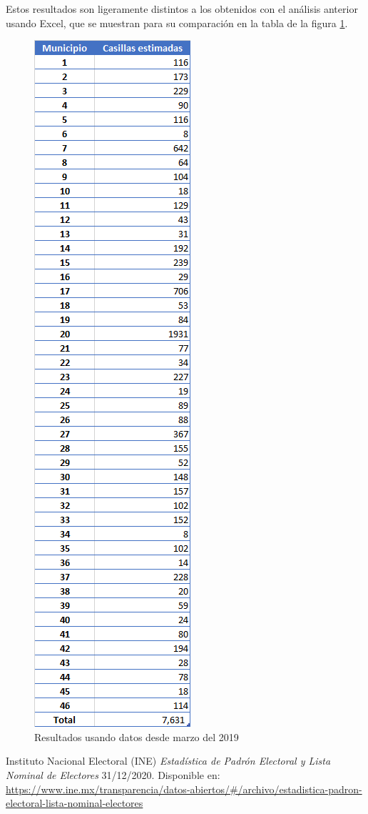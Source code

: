 \documentclass[twocolumn]{article}
\begin{document}
Estos resultados son ligeramente distintos a los obtenidos con el análisis anterior usando Excel, que se muestran para su comparación en la tabla de la figura \ref{fig:1}.

\begin{figure}[p]
    \centering
    \includegraphics[scale=0.7]{Casillas.png}
    \caption{Resultados usando datos desde marzo del 2019}
    \label{fig:1}
\end{figure}

\begin{thebibliography}{9}
Instituto Nacional Electoral (INE)
\textit{Estadística de Padrón 
Electoral y Lista Nominal de Electores}
31/12/2020. Disponible en: \url{https://www.ine.mx/transparencia/datos-abiertos/#/archivo/estadistica-padron-electoral-lista-nominal-electores}
\end{thebibliography}
\end{document}
